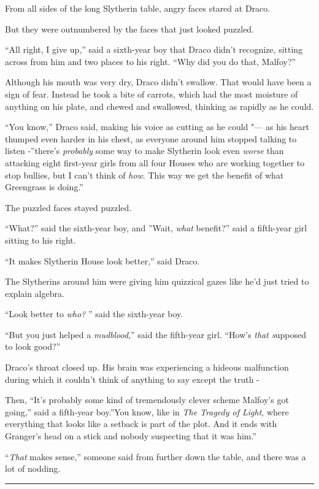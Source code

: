From all sides of the long Slytherin table, angry faces stared at Draco.

But they were outnumbered by the faces that just looked puzzled.

``All right, I give up,'' said a sixth-year boy that Draco didn't
recognize, sitting across from him and two places to his right. ``Why
did you do that, Malfoy?''

Although his mouth was very dry, Draco didn't swallow. That would have
been a sign of fear. Instead he took a bite of carrots, which had the
most moisture of anything on his plate, and chewed and swallowed,
thinking as rapidly as he could.

``You know,'' Draco said, making his voice as cutting as he could "--- as
his heart thumped even harder in his chest, as everyone around him
stopped talking to listen -''there's \emph{probably} some way to make
Slytherin look even \emph{worse} than attacking eight first-year girls
from all four Houses who are working together to stop bullies, but I
can't think of \emph{how}. This way we get the benefit of what
Greengrass is doing.''

The puzzled faces stayed puzzled.

``What?'' said the sixth-year boy, and ''Wait, \emph{what} benefit?''
said a fifth-year girl sitting to his right.

``It makes Slytherin House look better,'' said Draco.

The Slytherins around him were giving him quizzical gazes like he'd just
tried to explain algebra.

``Look better to \emph{who?} '' said the sixth-year boy.

``But you just helped a \emph{mudblood},'' said the fifth-year girl.
``How's \emph{that s}upposed to look good?''

Draco's throat closed up. His brain was experiencing a hideous
malfunction during which it couldn't think of anything to say except the
truth -

Then, ``It's probably some kind of tremendously clever scheme Malfoy's
got going,'' said a fifth-year boy.''You know, like in \emph{The Tragedy
of Light}, where everything that looks like a setback is part of the
plot. And it ends with Granger's head on a stick and nobody suspecting
that it was him.''

``\emph{That} makes sense,'' someone said from further down the table,
and there was a lot of nodding.

\begin{center}\rule{3in}{0.4pt}\end{center}

